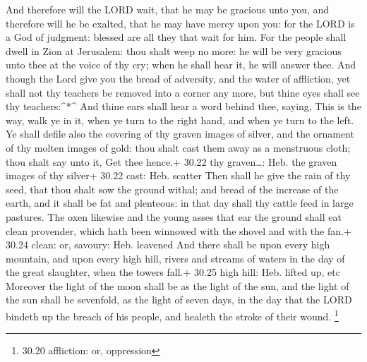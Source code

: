  And therefore will the LORD wait, that he may be gracious
unto you, and therefore will he be exalted, that he may have mercy upon
you: for the LORD is a God of judgment: blessed are all they that wait
for him.  For the people shall dwell in Zion at Jerusalem:
thou shalt weep no more: he will be very gracious unto thee at the voice
of thy cry; when he shall hear it, he will answer thee. 
And though the Lord give you the bread of adversity, and the water of
affliction, yet shall not thy teachers be removed into a corner any
more, but thine eyes shall see thy teachers:\^{}*\^{}  And
thine ears shall hear a word behind thee, saying, This is the way, walk
ye in it, when ye turn to the right hand, and when ye turn to the left.
 Ye shall defile also the covering of thy graven images of
silver, and the ornament of thy molten images of gold: thou shalt cast
them away as a menstruous cloth; thou shalt say unto it, Get thee
hence.+ 30.22 thy graven\ldots: Heb. the graven images of thy silver+
30.22 cast: Heb. scatter  Then shall he give the rain of
thy seed, that thou shalt sow the ground withal; and bread of the
increase of the earth, and it shall be fat and plenteous: in that day
shall thy cattle feed in large pastures.  The oxen likewise
and the young asses that ear the ground shall eat clean provender, which
hath been winnowed with the shovel and with the fan.+ 30.24 clean: or,
savoury: Heb. leavened  And there shall be upon every high
mountain, and upon every high hill, rivers and streams of waters in the
day of the great slaughter, when the towers fall.+ 30.25 high hill: Heb.
lifted up, etc  Moreover the light of the moon shall be as
the light of the sun, and the light of the sun shall be sevenfold, as
the light of seven days, in the day that the LORD bindeth up the breach
of his people, and healeth the stroke of their wound. \footnote{30.20
  affliction: or, oppression}

